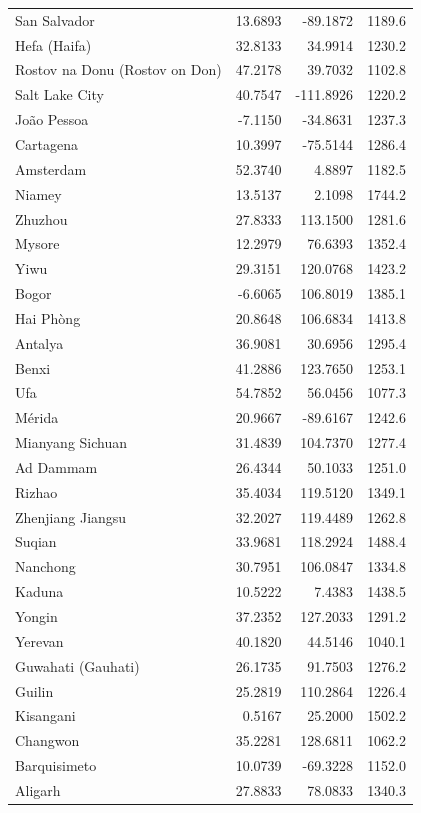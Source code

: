 \begin{longtable}{lrrc}
San Salvador & 13.6893 & -89.1872 & 1189.6 \\
Hefa (Haifa) & 32.8133 & 34.9914 & 1230.2 \\
Rostov na Donu (Rostov on Don) & 47.2178 & 39.7032 & 1102.8 \\
Salt Lake City & 40.7547 & -111.8926 & 1220.2 \\
João Pessoa & -7.1150 & -34.8631 & 1237.3 \\
Cartagena & 10.3997 & -75.5144 & 1286.4 \\
Amsterdam & 52.3740 & 4.8897 & 1182.5 \\
Niamey & 13.5137 & 2.1098 & 1744.2 \\
Zhuzhou & 27.8333 & 113.1500 & 1281.6 \\
Mysore & 12.2979 & 76.6393 & 1352.4 \\
Yiwu & 29.3151 & 120.0768 & 1423.2 \\
Bogor & -6.6065 & 106.8019 & 1385.1 \\
Hai Phòng & 20.8648 & 106.6834 & 1413.8 \\
Antalya & 36.9081 & 30.6956 & 1295.4 \\
Benxi & 41.2886 & 123.7650 & 1253.1 \\
Ufa & 54.7852 & 56.0456 & 1077.3 \\
Mérida & 20.9667 & -89.6167 & 1242.6 \\
Mianyang  Sichuan & 31.4839 & 104.7370 & 1277.4 \\
Ad Dammam & 26.4344 & 50.1033 & 1251.0 \\
Rizhao & 35.4034 & 119.5120 & 1349.1 \\
Zhenjiang  Jiangsu & 32.2027 & 119.4489 & 1262.8 \\
Suqian & 33.9681 & 118.2924 & 1488.4 \\
Nanchong & 30.7951 & 106.0847 & 1334.8 \\
Kaduna & 10.5222 & 7.4383 & 1438.5 \\
Yongin & 37.2352 & 127.2033 & 1291.2 \\
Yerevan & 40.1820 & 44.5146 & 1040.1 \\
Guwahati (Gauhati) & 26.1735 & 91.7503 & 1276.2 \\
Guilin & 25.2819 & 110.2864 & 1226.4 \\
Kisangani & 0.5167 & 25.2000 & 1502.2 \\
Changwon & 35.2281 & 128.6811 & 1062.2 \\
Barquisimeto & 10.0739 & -69.3228 & 1152.0 \\
Aligarh & 27.8833 & 78.0833 & 1340.3 \\

\end{longtable}
